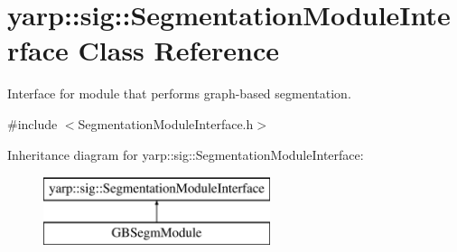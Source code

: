 \section{yarp\+:\+:sig\+:\+:Segmentation\+Module\+Interface Class Reference}
\label{classyarp_1_1sig_1_1SegmentationModuleInterface}


Interface for module that performs graph-\/based segmentation.  




{\ttfamily \#include $<$Segmentation\+Module\+Interface.\+h$>$}

Inheritance diagram for yarp\+:\+:sig\+:\+:Segmentation\+Module\+Interface\+:\begin{figure}[H]
\begin{center}
\leavevmode
\includegraphics[height=2.000000cm]{classyarp_1_1sig_1_1SegmentationModuleInterface}
\end{center}
\end{figure}
